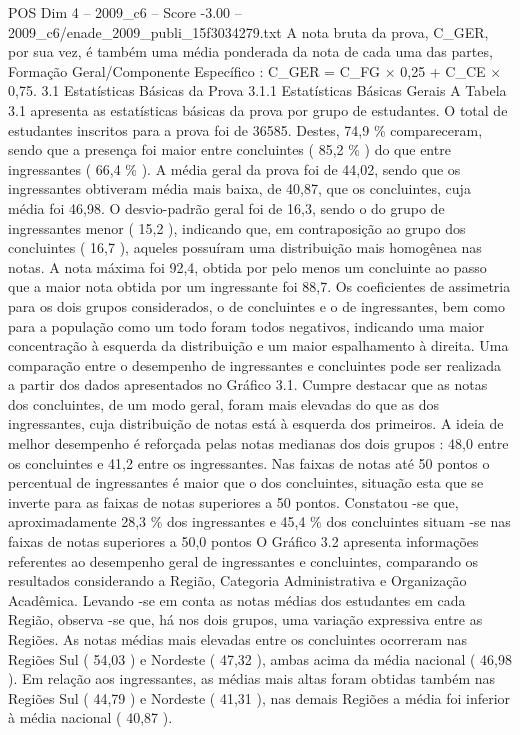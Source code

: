 \begin{textsample}{POS Dim 4 – 2009\_c6 – Score -3.00 – 2009\_c6/enade\_2009\_publi\_15f3034279.txt}
A nota bruta da prova, C\_GER, por sua vez, é também uma média ponderada da nota de cada uma das partes, Formação Geral/Componente Específico : C\_GER = C\_FG × 0,25 + C\_CE × 0,75. 3.1 Estatísticas Básicas da Prova 3.1.1 Estatísticas Básicas Gerais A Tabela 3.1 apresenta as estatísticas básicas da prova por grupo de estudantes.
O total de estudantes inscritos para a prova foi de 36585.
Destes, 74,9 \% compareceram, sendo que a presença foi maior entre concluintes ( 85,2 \% ) do que entre ingressantes ( 66,4 \% ).
A média geral da prova foi de 44,02, sendo que os ingressantes obtiveram média mais baixa, de 40,87, que os concluintes, cuja média foi 46,98.
O desvio-padrão geral foi de 16,3, sendo o do grupo de ingressantes menor ( 15,2 ), indicando que, em contraposição ao grupo dos concluintes ( 16,7 ), aqueles possuíram uma distribuição mais homogênea nas notas.
A nota máxima foi 92,4, obtida por pelo menos um concluinte ao passo que a maior nota obtida por um ingressante foi 88,7.
Os coeficientes de assimetria para os dois grupos considerados, o de concluintes e o de ingressantes, bem como para a população como um todo foram todos negativos, indicando uma maior concentração à esquerda da distribuição e um maior espalhamento à direita.
Uma comparação entre o desempenho de ingressantes e concluintes pode ser realizada a partir dos dados apresentados no Gráfico 3.1.
Cumpre destacar que as notas dos concluintes, de um modo geral, foram mais elevadas do que as dos ingressantes, cuja distribuição de notas está à esquerda dos primeiros.
A ideia de melhor desempenho é reforçada pelas notas medianas dos dois grupos : 48,0 entre os concluintes e 41,2 entre os ingressantes.
Nas faixas de notas até 50 pontos o percentual de ingressantes é maior que o dos concluintes, situação esta que se inverte para as faixas de notas superiores a 50 pontos.
Constatou -se que, aproximadamente 28,3 \% dos ingressantes e 45,4 \% dos concluintes situam -se nas faixas de notas superiores a 50,0 pontos O Gráfico 3.2 apresenta informações referentes ao desempenho geral de ingressantes e concluintes, comparando os resultados considerando a Região, Categoria Administrativa e Organização Acadêmica.
Levando -se em conta as notas médias dos estudantes em cada Região, observa -se que, há nos dois grupos, uma variação expressiva entre as Regiões.
As notas médias mais elevadas entre os concluintes ocorreram nas Regiões Sul ( 54,03 ) e Nordeste ( 47,32 ), ambas acima da média nacional ( 46,98 ).
Em relação aos ingressantes, as médias mais altas foram obtidas também nas Regiões Sul ( 44,79 ) e Nordeste ( 41,31 ), nas demais Regiões a média foi inferior à média nacional ( 40,87 ).

\end{textsample}
